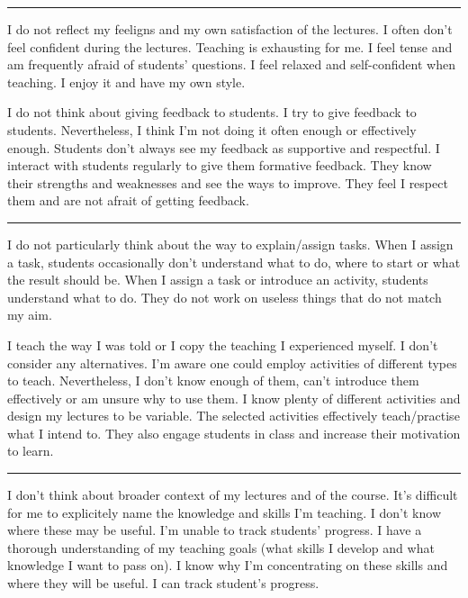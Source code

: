 \rule{\textwidth}{0.4pt}
{I do not reflect my feeligns and my own satisfaction of the lectures.}
{I often don't feel confident during the lectures. Teaching is exhausting for me. I feel tense and am frequently afraid of students' questions.}
{I feel relaxed and self-confident when teaching. I enjoy it and have my own style.}

\newpage
{}
{I do not think about giving feedback to students.}
{I try to give feedback to students. Nevertheless, I think I'm not doing it often enough or effectively enough. Students don't always see my feedback as supportive and respectful.}
{I interact with students regularly to give them formative feedback. They know their strengths and weaknesses and see the ways to improve. They feel I respect them and are not afrait of getting feedback.}

\rule{\textwidth}{0.4pt}
{I do not particularly think about the way to explain/assign tasks.}
{When I assign a task, students occasionally don't understand what to do, where to start or what the result should be.}
{When I assign a task or introduce an activity, students understand what to do. They do not work on useless things that do not match my aim.}

\newpage
{}
{I teach the way I was told or I copy the teaching I experienced myself. I don't consider any alternatives.}
{I'm aware one could employ activities of different types to teach. Nevertheless, I don't know enough of them, can't introduce them effectively or am unsure why to use them.}
{I know plenty of different activities and design my lectures to be variable. The selected activities effectively teach/practise what I intend to. They also engage students in class and increase their motivation to learn.}

\rule{\textwidth}{0.4pt}
{I don't think about broader context of my lectures and of the course.}
{It's difficult for me to explicitely name the knowledge and skills I'm teaching. I don't know where these may be useful. I'm unable to track students' progress.}
{I have a thorough understanding of my teaching goals (what skills I develop and what knowledge I want to pass on). I know why I'm concentrating on these skills and where they will be useful. I can track student's progress.}
\vspace*{-1em}

